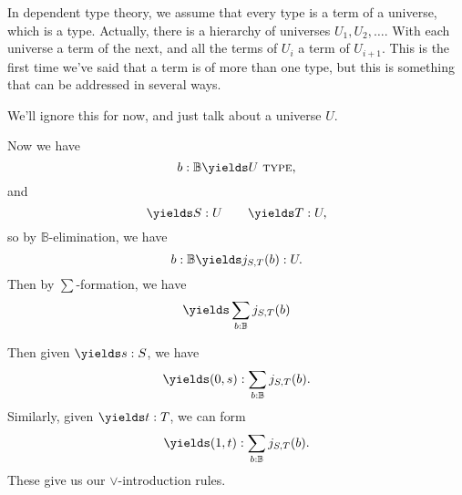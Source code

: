 \documentclass{article}
\newcommand\TYPE{\text{ \scshape{type}}}
\newcommand\BB{\mathbb{B}}
\begin{document}
In dependent type theory, we assume that every type is a term 
of a universe, which is a type. Actually, there is a hierarchy 
of universes $U_1,U_2,\ldots$. With each universe a term of 
the next, and all the terms of $U_i$ a term of $U_{i+1}$.
This is the first time we've said that a term is of more 
than one type, but this is something that can be addressed 
in several ways.

We'll ignore this for now, and just talk about a universe $U$.

Now we have 
\[ b:\BB \yields U\TYPE, \]
and 
\[ \yields S:U\qquad \yields T:U,\]
so by $\BB$-elimination, we have 
\[ b:\BB \yields j_{S,T}(b):U.\]
Then by $\sum$-formation, we have 
\[ \yields \sum_{b:\BB} j_{S,T}(b) \]

Then given $\yields s:S$, we have 
\[\yields (0,s) : \sum_{b:\BB} j_{S,T}(b). \]
Similarly, given $\yields t:T$, we can form
\[\yields (1,t):\sum_{b:\BB} j_{S,T}(b).\]
These give us our $\vee$-introduction rules.
\end{document}
